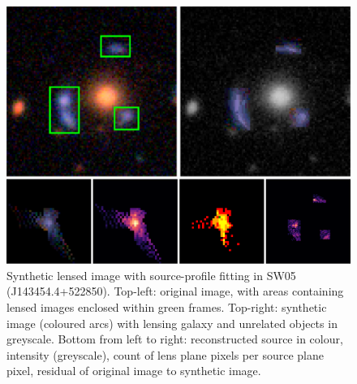 \documentclass[fleqn,usenatbib]{mnras}
\begin{document}
\begin{figure}
  \includegraphics[width=\linewidth]{img/new_synth_img_detailed}
  \caption{Synthetic lensed image with source-profile fitting in SW05
    (J143454.4+522850). Top-left: original image, with areas
    containing lensed images enclosed within green frames.  Top-right:
    synthetic image (coloured arcs) with lensing galaxy and unrelated
    objects in greyscale.  Bottom from left to right: reconstructed
    source in colour, intensity (greyscale), count of lens plane
    pixels per source plane pixel, residual of original image to
    synthetic image.}
  \label{fig:synthimg}
\end{figure}
\end{document}
